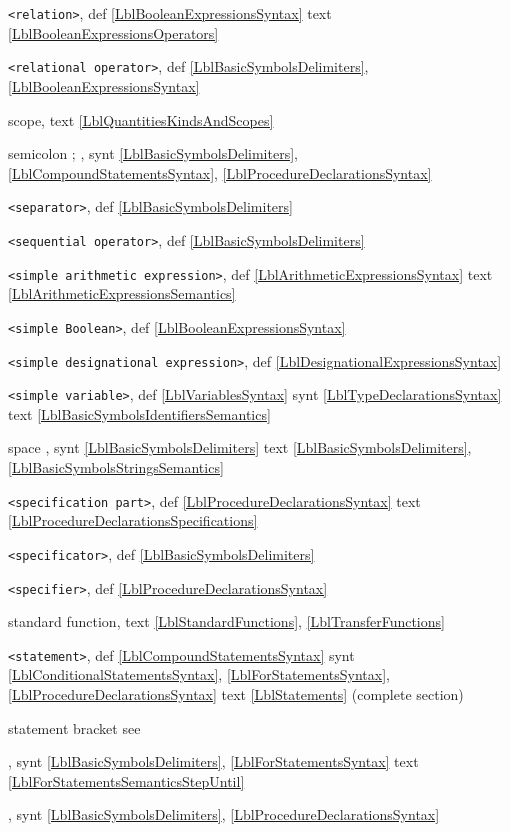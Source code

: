 \documentclass[a4paper,11pt]{article}
\begin{document}
\texttt{<relation>},
def
\ref{LblBooleanExpressionsSyntax}
text
\ref{LblBooleanExpressionsOperators}\*

\texttt{<relational operator>},
def
\ref{LblBasicSymbolsDelimiters},
\ref{LblBooleanExpressionsSyntax}\*

scope,
text
\ref{LblQuantitiesKindsAndScopes}\*

semicolon ; ,
synt
\ref{LblBasicSymbolsDelimiters},
\ref{LblCompoundStatementsSyntax},
\ref{LblProcedureDeclarationsSyntax}\*

\texttt{<separator>},
def
\ref{LblBasicSymbolsDelimiters}\*

\texttt{<sequential operator>},
def
\ref{LblBasicSymbolsDelimiters}\*

\texttt{<simple arithmetic expression>},
def
\ref{LblArithmeticExpressionsSyntax}
text
\ref{LblArithmeticExpressionsSemantics}\*

\texttt{<simple Boolean>},
def
\ref{LblBooleanExpressionsSyntax}\*

\texttt{<simple designational expression>},
def
\ref{LblDesignationalExpressionsSyntax}\*


\texttt{<simple variable>},
def
\ref{LblVariablesSyntax}
synt
\ref{LblTypeDeclarationsSyntax}
text
\ref{LblBasicSymbolsIdentifiersSemantics}\*

space \blankchar{},
synt
\ref{LblBasicSymbolsDelimiters}
text
\ref{LblBasicSymbolsDelimiters},
\ref{LblBasicSymbolsStringsSemantics}\*

\texttt{<specification part>},
def
\ref{LblProcedureDeclarationsSyntax}
text
\ref{LblProcedureDeclarationsSpecifications}\*

\texttt{<specificator>},
def
\ref{LblBasicSymbolsDelimiters}\*

\texttt{<specifier>},
def
\ref{LblProcedureDeclarationsSyntax}\*

standard function,
text
\ref{LblStandardFunctions},
\ref{LblTransferFunctions}\*

\texttt{<statement>},
def
\ref{LblCompoundStatementsSyntax}
synt
\ref{LblConditionalStatementsSyntax},
\ref{LblForStatementsSyntax},
\ref{LblProcedureDeclarationsSyntax}
text
\ref{LblStatements} (complete section)\*

statement bracket see  \*

,
synt
\ref{LblBasicSymbolsDelimiters},
\ref{LblForStatementsSyntax}
text
\ref{LblForStatementsSemanticsStepUntil}\*

,
synt
\ref{LblBasicSymbolsDelimiters},
\ref{LblProcedureDeclarationsSyntax}\*
\end{document}
